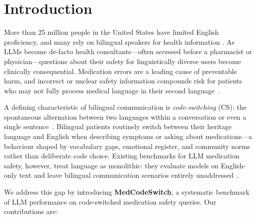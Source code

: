 \documentclass[3p,times,procedia]{elsarticle}
\begin{document}
\section{Introduction}
\label{sec:intro}

More than 25 million people in the United States have limited English
proficiency, and many rely on bilingual speakers for health information
\cite{US2015}.
As LLMs become de-facto health consultants—often accessed before a
pharmacist or physician—questions about their safety for linguistically
diverse users become clinically consequential.
Medication errors are a leading cause of preventable harm, and incorrect or
unclear safety information compounds risk for patients who may not fully
process medical language in their second language~\cite{WHO2019}.

A defining characteristic of bilingual communication is \emph{code-switching}
(CS): the spontaneous alternation between two languages within a conversation
or even a single sentence~\cite{Poplack1980}.
Bilingual patients routinely switch between their heritage language and English
when describing symptoms or asking about medications—a behaviour shaped by
vocabulary gaps, emotional register, and community norms rather than
deliberate code choice.
Existing benchmarks for LLM medication safety, however, treat language
as monolithic: they evaluate models on English-only text and leave bilingual
communication scenarios entirely unaddressed~\cite{Zhao2025,Wu2025,Li2024}.

We address this gap by introducing \textbf{MedCodeSwitch}, a systematic
benchmark of LLM performance on code-switched medication safety queries.
Our contributions are:
\end{document}
